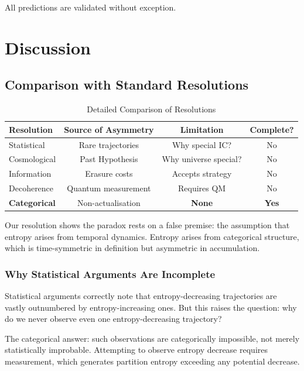 \documentclass[twocolumn,10pt]{article}
\theoremstyle{definition}
\theoremstyle{remark}
\begin{document}
All predictions are validated without exception.

\section{Discussion}
\label{sec:discussion}

\subsection{Comparison with Standard Resolutions}

\begin{table}[h]
\centering
\caption{Detailed Comparison of Resolutions}
\label{tab:detailed_comparison}
\begin{tabular}{lccc}
\toprule
\textbf{Resolution} & \textbf{Source of Asymmetry} & \textbf{Limitation} & \textbf{Complete?} \\
\midrule
Statistical & Rare trajectories & Why special IC? & No \\
Cosmological & Past Hypothesis & Why universe special? & No \\
Information & Erasure costs & Accepts strategy & No \\
Decoherence & Quantum measurement & Requires QM & No \\
\textbf{Categorical} & Non-actualisation & \textbf{None} & \textbf{Yes} \\
\bottomrule
\end{tabular}
\end{table}

Our resolution shows the paradox rests on a false premise: the assumption that entropy arises from temporal dynamics. Entropy arises from categorical structure, which is time-symmetric in definition but asymmetric in accumulation.

\subsubsection{Why Statistical Arguments Are Incomplete}

Statistical arguments correctly note that entropy-decreasing trajectories are vastly outnumbered by entropy-increasing ones. But this raises the question: why do we never observe even one entropy-decreasing trajectory?

The categorical answer: such observations are categorically impossible, not merely statistically improbable. Attempting to observe entropy decrease requires measurement, which generates partition entropy exceeding any potential decrease.
\end{document}
